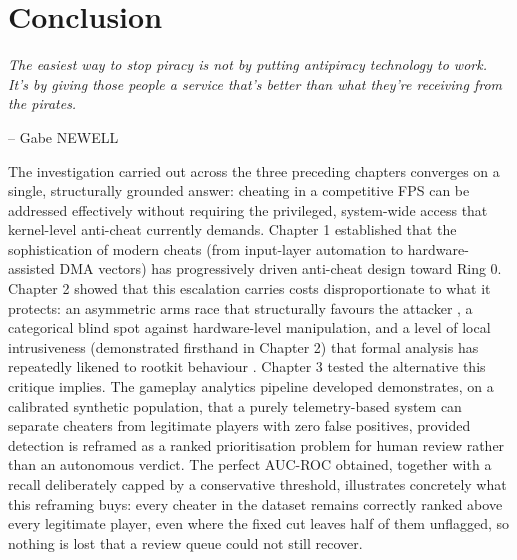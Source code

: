 \stopcontents[chapters]
\chapter*{Conclusion}
\label{chap:conclu}

\epigraph{\itshape The easiest way to stop piracy is not by putting antipiracy technology to work. It's by giving those people a service that's better than what they're receiving from the pirates.}{-- Gabe NEWELL}

\fancyhead{}

The investigation carried out across the three preceding chapters converges on a single, structurally grounded answer: cheating in a competitive FPS can be addressed effectively without requiring the privileged, system-wide access that kernel-level anti-cheat currently demands. Chapter 1 established that the sophistication of modern cheats (from input-layer automation to hardware-assisted DMA vectors) has progressively driven anti-cheat design toward Ring 0. Chapter 2 showed that this escalation carries costs disproportionate to what it protects: an asymmetric arms race that structurally favours the attacker \cite{Kuzhii2024}, a categorical blind spot against hardware-level manipulation, and a level of local intrusiveness (demonstrated firsthand in Chapter 2) that formal analysis has repeatedly likened to rootkit behaviour \cite{Dorner2024}. Chapter 3 tested the alternative this critique implies. The gameplay analytics pipeline developed demonstrates, on a calibrated synthetic population, that a purely telemetry-based system can separate cheaters from legitimate players with zero false positives, provided detection is reframed as a ranked prioritisation problem for human review rather than an autonomous verdict. The perfect AUC-ROC obtained, together with a recall deliberately capped by a conservative threshold, illustrates concretely what this reframing buys: every cheater in the dataset remains correctly ranked above every legitimate player, even where the fixed cut leaves half of them unflagged, so nothing is lost that a review queue could not still recover.

